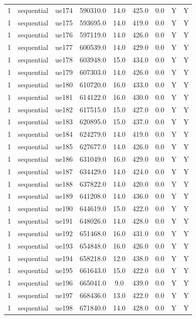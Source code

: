 \begin{table}[ht]
\begin{tabular}{|c|c|c|c|c|c|c|c|c|}
1 & sequential & ue174 & 590310.0 & 14.0 & 425.0 & 0.0 & Y & Y \\
1 & sequential & ue175 & 593695.0 & 14.0 & 419.0 & 0.0 & Y & Y \\
1 & sequential & ue176 & 597119.0 & 14.0 & 426.0 & 0.0 & Y & Y \\
1 & sequential & ue177 & 600539.0 & 14.0 & 429.0 & 0.0 & Y & Y \\
1 & sequential & ue178 & 603948.0 & 15.0 & 434.0 & 0.0 & Y & Y \\
1 & sequential & ue179 & 607303.0 & 14.0 & 426.0 & 0.0 & Y & Y \\
1 & sequential & ue180 & 610720.0 & 16.0 & 433.0 & 0.0 & Y & Y \\
1 & sequential & ue181 & 614122.0 & 16.0 & 430.0 & 0.0 & Y & Y \\
1 & sequential & ue182 & 617515.0 & 15.0 & 427.0 & 0.0 & Y & Y \\
1 & sequential & ue183 & 620895.0 & 15.0 & 437.0 & 0.0 & Y & Y \\
1 & sequential & ue184 & 624279.0 & 14.0 & 419.0 & 0.0 & Y & Y \\
1 & sequential & ue185 & 627677.0 & 14.0 & 426.0 & 0.0 & Y & Y \\
1 & sequential & ue186 & 631049.0 & 16.0 & 429.0 & 0.0 & Y & Y \\
1 & sequential & ue187 & 634429.0 & 14.0 & 424.0 & 0.0 & Y & Y \\
1 & sequential & ue188 & 637822.0 & 14.0 & 420.0 & 0.0 & Y & Y \\
1 & sequential & ue189 & 641208.0 & 14.0 & 436.0 & 0.0 & Y & Y \\
1 & sequential & ue190 & 644619.0 & 15.0 & 422.0 & 0.0 & Y & Y \\
1 & sequential & ue191 & 648026.0 & 14.0 & 428.0 & 0.0 & Y & Y \\
1 & sequential & ue192 & 651468.0 & 16.0 & 431.0 & 0.0 & Y & Y \\
1 & sequential & ue193 & 654848.0 & 16.0 & 426.0 & 0.0 & Y & Y \\
1 & sequential & ue194 & 658218.0 & 12.0 & 438.0 & 0.0 & Y & Y \\
1 & sequential & ue195 & 661643.0 & 15.0 & 422.0 & 0.0 & Y & Y \\
1 & sequential & ue196 & 665041.0 & 9.0 & 439.0 & 0.0 & Y & Y \\
1 & sequential & ue197 & 668436.0 & 13.0 & 422.0 & 0.0 & Y & Y \\
1 & sequential & ue198 & 671840.0 & 14.0 & 428.0 & 0.0 & Y & Y \\

\end{tabular}
\end{table}
